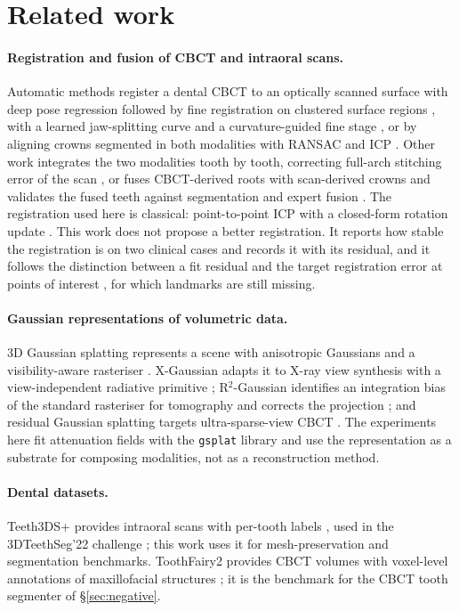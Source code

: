 \documentclass[11pt,a4paper]{article}
\newcommand{\code}[1]{\texttt{\small #1}}
\begin{document}
\section{Related work}\label{sec:relatedwork}

\paragraph{Registration and fusion of CBCT and intraoral scans.} Automatic methods register a
dental CBCT to an optically scanned surface with deep pose regression followed by fine
registration on clustered surface regions \cite{chung2020registration}, with a learned
jaw-splitting curve and a curvature-guided fine stage \cite{kim2023splitjaw}, or by aligning
crowns segmented in both modalities with RANSAC and ICP \cite{kim2023bioeng}. Other work
integrates the two modalities tooth by tooth, correcting full-arch stitching error of the
scan \cite{jang2024integration}, or fuses CBCT-derived roots with scan-derived crowns and
validates the fused teeth against segmentation and expert fusion \cite{baldini2025fusion}.
The registration used here is classical: point-to-point ICP \cite{besl1992} with a
closed-form rotation update \cite{kabsch1976}. This work does not propose a better
registration. It reports how stable the registration is on two clinical cases and records
it with its residual, and it follows the distinction between a fit residual and the target
registration error at points of interest \cite{fitzpatrick1998}, for which landmarks are
still missing.

\paragraph{Gaussian representations of volumetric data.} 3D Gaussian splatting represents a
scene with anisotropic Gaussians and a visibility-aware rasteriser \cite{kerbl2023}.
X-Gaussian adapts it to X-ray view synthesis with a view-independent radiative primitive
\cite{xgaussian}; R$^2$-Gaussian identifies an integration bias of the standard
rasteriser for tomography and corrects the projection \cite{r2gaussian}; and residual
Gaussian splatting targets ultra-sparse-view CBCT \cite{rgs}. The experiments here fit
attenuation fields with the \code{gsplat} library \cite{gsplat} and use the representation
as a substrate for composing modalities, not as a reconstruction method.

\paragraph{Dental datasets.} Teeth3DS+ provides intraoral scans with per-tooth labels
\cite{teeth3ds}, used in the 3DTeethSeg'22 challenge \cite{teethseg22}; this work uses it for
mesh-preservation and segmentation benchmarks. ToothFairy2 provides CBCT volumes with
voxel-level annotations of maxillofacial structures \cite{toothfairy2}; it is the benchmark
for the CBCT tooth segmenter of \S\ref{sec:negative}.
\end{document}

